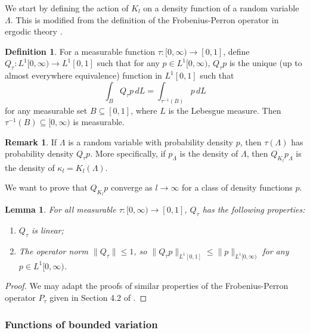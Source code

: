 \documentclass[a4paper]{article}
\newtheorem{lemma}[theorem]{Lemma}%
\theoremstyle{definition}
\newtheorem{definition}[theorem]{Definition}
\newtheorem{remark}[theorem]{Remark}%
\numberwithin{equation}{section}
\numberwithin{theorem}{section}
\begin{document}
{We start by defining the action of $K_l$ on a density function of a random variable $\Lambda$. This is modified from the definition of the Frobenius-Perron operator in ergodic theory \cite{boyarsky1997laws}.
\begin{definition}
    For a measurable function $\tau:[0,\infty)\rightarrow[0,1]$, define $Q_\tau:  L^1[0,\infty) \rightarrow  L^1[0,1]$ such that for any $p\in L^1[0,\infty)$, $Q_{\tau}p$ is the unique (up to almost everywhere equivalence) function in $ L^1[0,1]$ such that
    \begin{equation*}
        \int_B Q_\tau p \,dL = \int_{\tau^{-1}(B)} p\,dL
    \end{equation*}
    for any measurable set $B\subseteq[0,1]$, where $L$ is the Lebesgue measure. Then $\tau^{-1}(B)\subseteq[0,\infty)$ is measurable.
\end{definition}
\begin{remark} \label{rmk:Q_interpretation}
    If $\Lambda$ is a random variable with probability density $p$, then $\tau(\Lambda)$ has probability density $Q_\tau p$. More specifically, if $p_\Lambda$ is the density of $\Lambda$, then $Q_{K_l}p_\Lambda$ is the density of $\kappa_l=K_l(\Lambda)$.
\end{remark}

We want to prove that $Q_{K_l}p$ converge as $l\rightarrow\infty$ for a class of density functions $p$.

\begin{lemma} \label{lm:Qproperties}
    For all measurable $\tau:[0,\infty)\rightarrow[0,1]$, $Q_\tau$ has the following properties:
    \begin{enumerate}
        \item $Q_\tau$ is linear;
        \item The operator norm $\lVert Q_\tau \rVert \leq1$, so $\lVert Q_{\tau}p\rVert_{ L^1[0,1]}\leq\lVert p\rVert_{ L^1[0,\infty)}$ for any $p\in L^1[0,\infty)$.
    \end{enumerate}
\end{lemma}
\begin{proof}
    We may adapt the proofs of similar properties of the Frobenius-Perron operator $P_\tau$ given in Section 4.2 of \cite{boyarsky1997laws}.
\end{proof}

\subsubsection{Functions of bounded variation}

}
\end{document}
